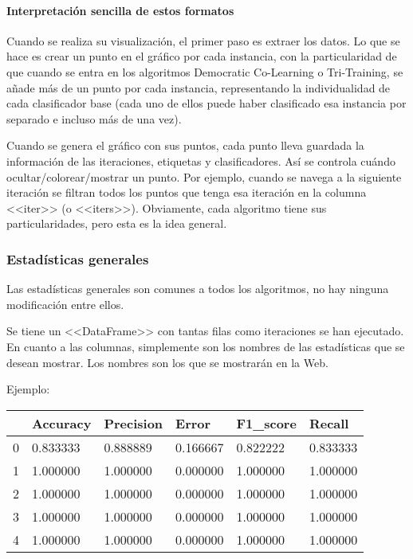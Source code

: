\paragraph{Interpretación sencilla de estos formatos} Cuando se realiza su
visualización, el primer paso es extraer los datos. Lo que se hace es crear un
punto en el gráfico por cada instancia, con la particularidad de que cuando se
entra en los algoritmos Democratic Co-Learning o Tri-Training, se añade más de
un punto por cada instancia, representando la individualidad de cada
clasificador base (cada uno de ellos puede haber clasificado esa instancia por
separado e incluso más de una vez).

Cuando se genera el gráfico con sus puntos, cada punto lleva guardada la
información de las iteraciones, etiquetas y clasificadores. Así se controla
cuándo ocultar/colorear/mostrar un punto. Por ejemplo, cuando se navega a la
siguiente iteración se filtran todos los puntos que tenga esa iteración en la
columna <<iter>> (o <<iters>>). Obviamente, cada algoritmo tiene sus
particularidades, pero esta es la idea general.

\subsubsection{Estadísticas generales}
Las estadísticas generales son comunes a todos los algoritmos, no hay ninguna
modificación entre ellos.

Se tiene un <<DataFrame>> con tantas filas como iteraciones se han ejecutado. En
cuanto a las columnas, simplemente son los nombres de las estadísticas que se
desean mostrar. Los nombres son los que se mostrarán en la Web.

Ejemplo:
\begin{table}[H]
\begin{tabular}{llllll}
  & Accuracy  & Precision & Error    & F1\_score & Recall    \\ \hline
0 & 0.833333  & 0.888889  & 0.166667 & 0.822222  & 0.833333  \\
1 & 1.000000 & 1.000000 & 0.000000 & 1.000000 & 1.000000 \\
2 & 1.000000 & 1.000000 & 0.000000 & 1.000000 & 1.000000 \\
3 & 1.000000 & 1.000000 & 0.000000 & 1.000000 & 1.000000 \\
4 & 1.000000 & 1.000000 & 0.000000 & 1.000000 & 1.000000
\end{tabular}
\end{table}

